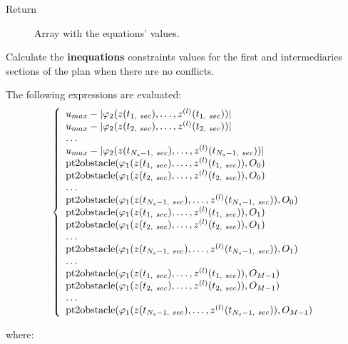 \documentclass[letterpaper,10pt,english]{sphinxmanual}
\begin{document}
\begin{fulllineitems}
\begin{fulllineitems}
\begin{description}
\item[{Return}] \leavevmode
Array with the equations' values.

\end{description}

\end{fulllineitems}


\begin{fulllineitems}
\label{Multi-robot motion planner:planning_sim.Robot._sa_fieqcons}
Calculate the \textbf{inequations} constraints values for the first and intermediaries
sections of the plan when there are no conflicts.

The following expressions are evaluated:
\begin{gather}
\begin{split}\left\lbrace\begin{array}{lcl}
u_{max} - |\varphi_2(z(t_{1,\ sec}),\dotsc,z^{(l)}(t_{1,\ sec}))|\\
u_{max} - |\varphi_2(z(t_{2,\ sec}),\dotsc,z^{(l)}(t_{2,\ sec}))|\\
\dotsc\\
u_{max} - |\varphi_2(z(t_{N_s-1,\ sec}),\dotsc,z^{(l)}(t_{N_s-1,\ sec}))|\\
\mathrm{pt2obstacle}(\varphi_1(z(t_{1,\ sec}),\dotsc,z^{(l)}(t_{1,\ sec})), O_0)\\
\mathrm{pt2obstacle}(\varphi_1(z(t_{2,\ sec}),\dotsc,z^{(l)}(t_{2,\ sec})), O_0)\\
\dotsc\\
\mathrm{pt2obstacle}(\varphi_1(z(t_{N_s-1,\ sec}),
\dotsc,z^{(l)}(t_{N_s-1,\ sec})), O_0)\\
\mathrm{pt2obstacle}(\varphi_1(z(t_{1,\ sec}),\dotsc,z^{(l)}(t_{1,\ sec})), O_1)\\
\mathrm{pt2obstacle}(\varphi_1(z(t_{2,\ sec}),\dotsc,z^{(l)}(t_{2,\ sec})), O_1)\\
\dotsc\\
\mathrm{pt2obstacle}(\varphi_1(z(t_{N_s-1,\ sec}),
\dotsc,z^{(l)}(t_{N_s-1,\ sec})), O_1)\\
\dotsc\\
\mathrm{pt2obstacle}(\varphi_1(z(t_{1,\ sec}),
\dotsc,z^{(l)}(t_{1,\ sec})), O_{M-1})\\
\mathrm{pt2obstacle}(\varphi_1(z(t_{2,\ sec}),
\dotsc,z^{(l)}(t_{2,\ sec})), O_{M-1})\\
\dotsc\\
\mathrm{pt2obstacle}(\varphi_1(z(t_{N_s-1,\ sec}),
\dotsc,z^{(l)}(t_{N_s-1,\ sec})), O_{M-1})\\
\end{array}\right.\end{split}\notag
\end{gather}\begin{description}
\item[{where:}] \leavevmode
\begin{tabulary}{\linewidth}{|L|L|}
\hline


\end{tabulary}
\end{description}
\end{fulllineitems}
\end{fulllineitems}
\end{document}
